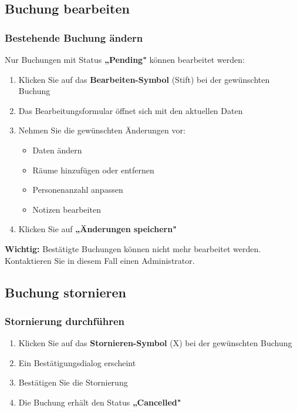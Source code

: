 \subsection{Buchung bearbeiten}

\subsubsection{Bestehende Buchung ändern}

Nur Buchungen mit Status \textbf{„Pending"} können bearbeitet werden:

\begin{enumerate}
    \item Klicken Sie auf das \textbf{Bearbeiten-Symbol} (Stift) bei der gewünschten Buchung
    \item Das Bearbeitungsformular öffnet sich mit den aktuellen Daten
    \item Nehmen Sie die gewünschten Änderungen vor:
        \begin{itemize}
            \item Daten ändern
            \item Räume hinzufügen oder entfernen
            \item Personenanzahl anpassen
            \item Notizen bearbeiten
        \end{itemize}
    \item Klicken Sie auf \textbf{„Änderungen speichern"}
\end{enumerate}

\textbf{Wichtig:} Bestätigte Buchungen können nicht mehr bearbeitet werden. Kontaktieren Sie in diesem Fall einen Administrator.

\subsection{Buchung stornieren}

\subsubsection{Stornierung durchführen}

\begin{enumerate}
    \item Klicken Sie auf das \textbf{Stornieren-Symbol} (X) bei der gewünschten Buchung
    \item Ein Bestätigungsdialog erscheint
    \item Bestätigen Sie die Stornierung
    \item Die Buchung erhält den Status \textbf{„Cancelled"}
\end{enumerate}

